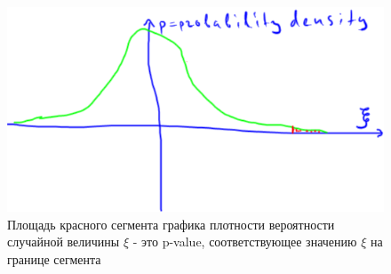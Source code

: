 \documentclass{book}
\begin{document}
\begin{figure}
    \centering
    \includegraphics[scale=.5]{img/p-value.png}
    \caption{Площадь красного сегмента графика плотности вероятности случайной величины $\xi$ - это p-value, соответствующее значению $\xi$ на границе сегмента}
    \label{pval}
\end{figure}



 
\end{document}

